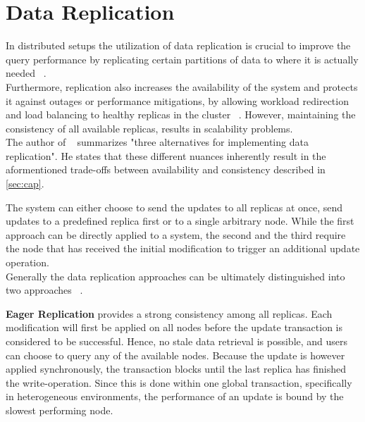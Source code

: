 


\section{Data Replication}

In distributed setups the utilization of data replication is crucial to improve the query performance
by replicating certain partitions of data to where it is actually needed ~\cite{cloudpart_2012}.\\
Furthermore, replication also increases the availability of the system and protects it against outages or performance mitigations,
by allowing workload redirection and load balancing to healthy replicas in the cluster ~\cite{quorums:2003}.
However, maintaining the consistency of all available replicas, results in scalability problems.\\
The author of ~\cite{abadi2012} summarizes "three alternatives for implementing data replication".
He states that these different nuances inherently result in the aformentioned trade-offs between availability and consistency described in \ref{sec:cap}.

The system can either choose to send the updates to all replicas at once, send updates to a predefined replica first or to a single arbitrary node.
 While the first approach can be directly applied to a system, the second and the third require the node that has received the initial modification to trigger an additional update operation.
\\
Generally the data replication approaches can be ultimately distinguished into two approaches ~\cite{gray:1996}.

\textbf{Eager Replication} provides a strong consistency among all replicas. Each modification will first be applied on all nodes
before the update transaction is considered to be successful. Hence, no stale data retrieval is possible, and users can choose to query any of the available nodes.
Because the update is however applied synchronously, the transaction blocks until the last replica has finished the write-operation. 
Since this is done within one global transaction, specifically in heterogeneous environments, the performance of an update is bound by the slowest performing node.\\

